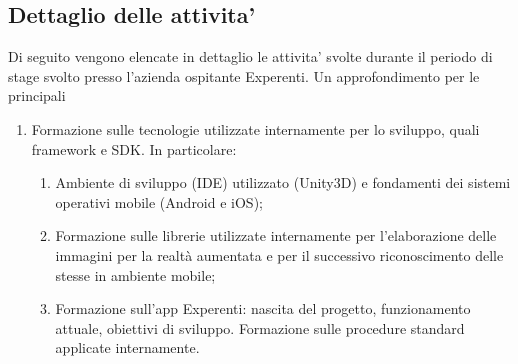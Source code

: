 \subsection{Dettaglio delle attivita'}
Di seguito vengono elencate in dettaglio le attivita' svolte durante il periodo di stage svolto presso l'azienda ospitante Experenti. Un approfondimento per le principali 

\begin{enumerate}
	\item	Formazione sulle tecnologie utilizzate internamente per lo sviluppo, quali framework e SDK. In particolare:

	\begin{enumerate}	
		\item	Ambiente di sviluppo (IDE) utilizzato (Unity3D) e fondamenti dei sistemi operativi mobile (Android e iOS); 
		\item	Formazione sulle librerie utilizzate internamente per l’elaborazione delle immagini per la realtà aumentata e per il successivo riconoscimento delle stesse in ambiente mobile; 
		\item	Formazione sull’app Experenti: nascita del progetto, funzionamento attuale, obiettivi di sviluppo. Formazione sulle procedure standard applicate internamente.	
	\end{enumerate}


\end{enumerate}
